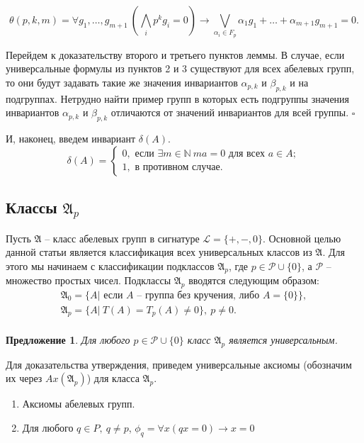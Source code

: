 \documentclass[a4paper,11pt,twoside]{article}
\newtheorem{proposition}{Предложение}[section]
\def\proof{{\noindent{\bf Доказательство.}} }
\def\A{{\mathfrak{A}}}
\def\P{{\mathcal{P}}}
\def\L{{\mathcal{L}}}
\def\N{{\mathbb{N}}}
\begin{document}
$$
\theta(p,k,m) = \forall g_1, \ldots, g_{m+1} \ (\bigwedge_i p^{k}g_{i} = 0) \rightarrow  \bigvee_{\alpha_i \in F_p} \alpha_1g_1 + \ldots + \alpha_{m+1}g_{m+1} = 0.
$$

Перейдем к доказательству второго и третьего пунктов леммы. В случае, если универсальные формулы из пунктов 2 и 3 существуют для  всех абелевых групп, то они будут задавать такие же значения инвариантов $\alpha_{p,k}$ и $\beta_{p,k}$ и на подгруппах. Нетрудно найти пример групп в которых есть подгруппы значения инвариантов $\alpha_{p,k}$ и $\beta_{p,k}$ отличаются от значений инвариантов для всей группы. $\square$

И, наконец, введем инвариант $\delta(A)$.
$$\delta(A) = \left\lbrace 
\begin{array}{l}  
0, \text{ если } \exists m \in \N \ ma = 0 \text{ для всех } a \in A; \\ 
1, \text{ в противном случае.}
\end{array} 
\right.$$


\subsection{Классы $\A_p$}

Пусть $\A$ -- класс абелевых групп в сигнатуре $\L = \{+, -, 0\}.$ Основной целью данной статьи является классификация всех универсальных классов из $\A$. Для этого мы начинаем с классификации подклассов $\A_p$, где $p \in \P \cup \{0\}$, а $\P$ -- множество простых чисел. Подклассы $\A_p$ вводятся следующим образом:
$$\begin{array}{c}
\A_0 = \{A |\text{ если } A \text{ -- группа без кручения, либо } A = \{0\} \}, \\
\A_p = \{A | \ T(A) = T_p(A) \neq 0 \}, \ p \neq 0. \\
\end{array}$$ 

\begin{proposition}
Для любого $p \in \P \cup \{0\}$ класс $\A_p$ является универсальным.
\end{proposition}
\proof
Для доказательства утверждения, приведем универсальные аксиомы (обозначим их через $Ax(\A_p)$) для класса $\A_p$. 
\begin{enumerate}
\item Аксиомы абелевых групп.
\item Для любого $q \in P, \ q \neq p$, $\phi_q = \forall x (qx = 0) \rightarrow x = 0$
\end{enumerate}
\end{document}

